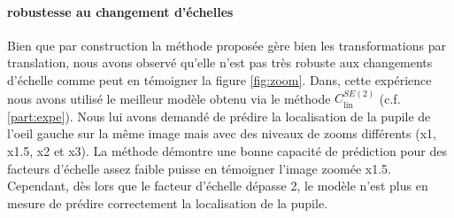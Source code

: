 \documentclass{article}
\begin{document}
\vspace{10em}
\paragraph{robustesse au changement d'échelles}\label{paragraph:robustness-to-scale}
Bien que par construction la méthode proposée gère bien les transformations par translation, nous 
avons observé qu'elle n'est pas très robuste aux changements d'échelle comme peut en témoigner la 
figure \ref{fig:zoom}. Dans, cette expérience nous avons utilisé le meilleur modèle obtenu via le méthode 
$C_{\text{lin}}^{SE(2)}$ (c.f. \ref{part:expe}). Nous lui avons demandé de prédire la localisation de la pupile de l'oeil 
gauche sur la même image mais avec des niveaux de zooms différents (x1, x1.5, x2 et x3). La méthode démontre 
une bonne capacité de prédiction pour des facteurs d'échelle assez faible puisse en témoigner l'image zoomée 
x1.5. Cependant, dès lors que le facteur d'échelle dépasse 2, le modèle n'est plus en mesure de prédire correctement 
la localisation de la pupile.  
\end{document}
